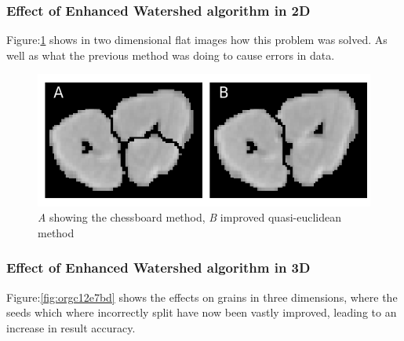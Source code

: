 \documentclass[11pt]{report}
\begin{document}
\subsubsection{Effect of Enhanced Watershed algorithm in 2D}
\label{sec:org7d26625}

Figure:\ref{fig:org57719d3} shows in two dimensional flat images how this problem was solved. As well as what the previous method was doing to cause errors in data.
\begin{figure}[htbp]
\centering
\includegraphics[width=16cm]{./images/chess_quasi.png}
\caption{\label{fig:org57719d3}
\emph{A} showing the chessboard method, \emph{B} improved quasi-euclidean method}
\end{figure}

\clearpage
\subsubsection{Effect of Enhanced Watershed algorithm in 3D}
\label{sec:orga0c334c}

Figure:\ref{fig:orgc12e7bd} shows the effects on grains in three dimensions, where the seeds which where incorrectly split have now been vastly improved, leading to an increase in result accuracy.
\end{document}
